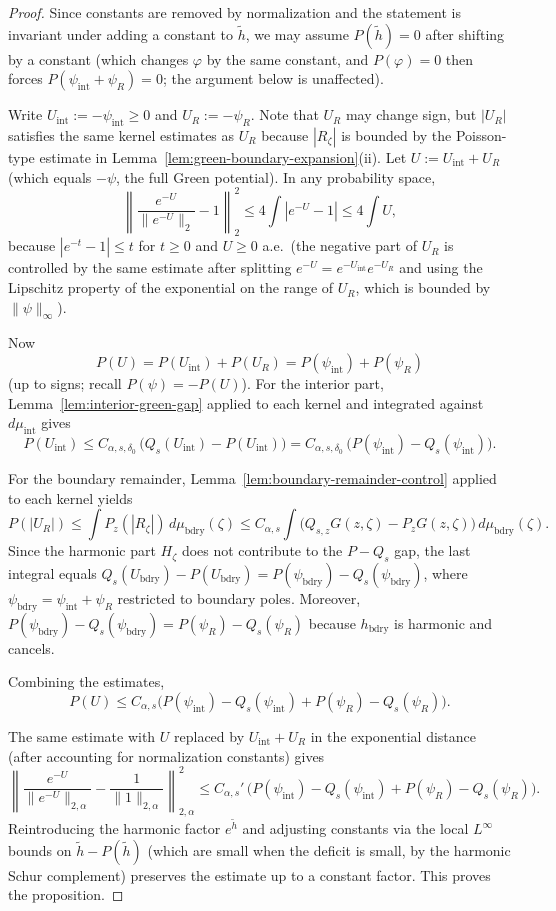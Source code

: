\documentclass[a4paper,10pt]{amsart}
\begin{document}
\begin{proof}
Since constants are removed by normalization and the statement is invariant
under adding a constant to $\widetilde h$, we may assume $P(\widetilde h)=0$ after shifting
by a constant (which changes $\varphi$ by the same constant, and
$P(\varphi)=0$ then forces $P(\psi_{\mathrm{int}}+\psi_R)=0$; the argument
below is unaffected).

Write $U_{\mathrm{int}}:=-\psi_{\mathrm{int}}\ge0$ and
$U_R:=-\psi_{R}$.  Note that $U_R$ may change sign, but $|U_R|$ satisfies
the same kernel estimates as $U_R$ because $|R_\zeta|$ is bounded by the
Poisson-type estimate in Lemma~\ref{lem:green-boundary-expansion}(ii).
Let $U:=U_{\mathrm{int}}+U_R$ (which equals $-\psi$, the full Green
potential).  In any probability space,
\[
\left\|\frac{e^{-U}}{\|e^{-U}\|_2}-1\right\|_2^2
\le 4\int|e^{-U}-1|
\le 4\int U,
\]
because $|e^{-t}-1|\le t$ for $t\ge0$ and $U\ge0$ a.e.\ (the negative part
of $U_R$ is controlled by the same estimate after splitting
$e^{-U}=e^{-U_{\mathrm{int}}}e^{-U_R}$ and using the Lipschitz property of
the exponential on the range of $U_R$, which is bounded by
$\|\psi\|_\infty$).

Now
\[
P(U)=P(U_{\mathrm{int}})+P(U_R)
=P(\psi_{\mathrm{int}})+P(\psi_R)
\]
(up to signs; recall $P(\psi)=-P(U)$).  For the interior part,
Lemma~\ref{lem:interior-green-gap} applied to each kernel and integrated
against $d\mu_{\mathrm{int}}$ gives
\[
P(U_{\mathrm{int}})
\le
C_{\alpha,s,\delta_0}\,
\bigl(Q_s(U_{\mathrm{int}})-P(U_{\mathrm{int}})\bigr)
=
C_{\alpha,s,\delta_0}\,
\bigl(P(\psi_{\mathrm{int}})-Q_s(\psi_{\mathrm{int}})\bigr).
\]

For the boundary remainder,
Lemma~\ref{lem:boundary-remainder-control} applied to each kernel yields
\[
P(|U_R|)
\le
\int P_z(|R_\zeta|)\,d\mu_{\mathrm{bdry}}(\zeta)
\le
C_{\alpha,s}
\int\bigl(Q_{s,z}G(z,\zeta)-P_zG(z,\zeta)\bigr)\,d\mu_{\mathrm{bdry}}(\zeta).
\]
Since the harmonic part $H_\zeta$ does not contribute to the $P-Q_s$ gap,
the last integral equals
$Q_s(U_{\mathrm{bdry}})-P(U_{\mathrm{bdry}})
=P(\psi_{\mathrm{bdry}})-Q_s(\psi_{\mathrm{bdry}})$,
where $\psi_{\mathrm{bdry}}=\psi_{\mathrm{int}}+\psi_R$ restricted to
boundary poles.  Moreover,
$P(\psi_{\mathrm{bdry}})-Q_s(\psi_{\mathrm{bdry}})
=P(\psi_R)-Q_s(\psi_R)$ because $h_{\mathrm{bdry}}$ is harmonic and cancels.

Combining the estimates,
\[
P(U)
\le
C_{\alpha,s}\bigl(P(\psi_{\mathrm{int}})-Q_s(\psi_{\mathrm{int}})
+P(\psi_R)-Q_s(\psi_R)\bigr).
\]

The same estimate with $U$ replaced by $U_{\mathrm{int}}+U_R$ in the
exponential distance (after accounting for normalization constants) gives
\[
\left\|\frac{e^{-U}}{\|e^{-U}\|_{2,\alpha}}
-\frac{1}{\|1\|_{2,\alpha}}\right\|_{2,\alpha}^2
\le
C_{\alpha,s}'\,
\bigl(P(\psi_{\mathrm{int}})-Q_s(\psi_{\mathrm{int}})
+P(\psi_R)-Q_s(\psi_R)\bigr).
\]
Reintroducing the harmonic factor $e^{\widetilde h}$ and adjusting constants via
the local $L^\infty$ bounds on $\widetilde h-P(\widetilde h)$ (which are small when the
deficit is small, by the harmonic Schur complement) preserves the estimate
up to a constant factor.  This proves the proposition.
\end{proof}
\end{document}
